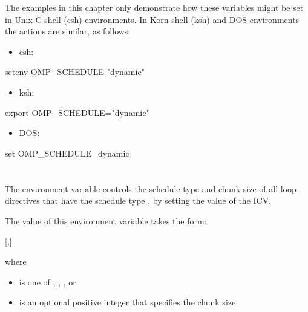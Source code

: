 The examples in this chapter only demonstrate how these variables might be set in Unix 
C shell (csh) environments. In Korn shell (ksh) and DOS environments the actions are 
similar, as follows:

\begin{itemize}
\item csh:
\end{itemize}

\begin{boxedcode}
setenv OMP\_SCHEDULE "dynamic"
\end{boxedcode}

\begin{itemize}
\item ksh:
\end{itemize}

\begin{boxedcode}
export OMP\_SCHEDULE="dynamic"
\end{boxedcode}

\begin{itemize}
\item DOS:
\end{itemize}

\begin{boxedcode}
set OMP\_SCHEDULE=dynamic
\end{boxedcode}










\section{}
\label{sec:OMP_SCHEDULE}
The  environment variable controls the schedule type and chunk size 
of all loop directives that have the schedule type , by setting the value of the 
 ICV.

The value of this environment variable takes the form:

[,]

where

\begin{itemize}
\item {} is one of , , , or 

\item {} is an optional positive integer that specifies the chunk size
\end{itemize}

